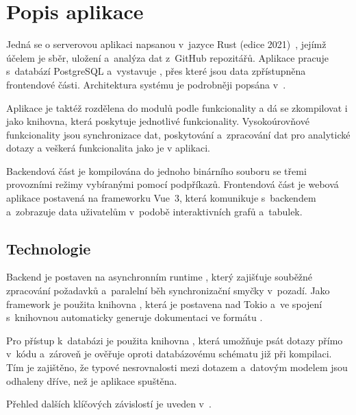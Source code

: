\section{Popis aplikace}
\label{sec:implementation:crabeye}

Jedná se o serverovou aplikaci napsanou v~jazyce Rust (edice 2021)~\cite{klabnik2018rust}, jejímž účelem je sběr, uložení a~analýza dat z~GitHub repozitářů. Aplikace pracuje s~databází PostgreSQL a~vystavuje \REST \API, přes které jsou data zpřístupněna frontendové části. Architektura systému je podrobněji popsána v~.

Aplikace je taktéž rozdělena do modulů podle funkcionality a dá se zkompilovat i jako knihovna, která poskytuje jednotlivé funkcionality. Vysokoúrovňové funkcionality jsou synchronizace dat, poskytování \API a~zpracování dat pro analytické dotazy a veškerá funkcionalita jako je v aplikaci.

Backendová část je kompilována do jednoho binárního souboru se třemi provozními režimy vybíranými pomocí \CLI podpříkazů. Frontendová část je webová \SPA aplikace postavená na frameworku Vue~3, která komunikuje s~\REST \API backendem a~zobrazuje data uživatelům v~podobě interaktivních grafů a~tabulek.

\subsection{Technologie}
\label{subsec:implementation:crabeye:techstack}

Backend je postaven na asynchronním runtime , který zajišťuje souběžné zpracování \HTTP požadavků a~paralelní běh synchronizační smyčky v~pozadí. Jako \HTTP framework je použita knihovna , která je postavena nad Tokio a~ve spojení s~knihovnou  automaticky generuje dokumentaci \API ve formátu .

Pro přístup k~databázi je použita knihovna , která umožňuje psát \SQL dotazy přímo v~kódu a~zároveň je ověřuje oproti databázovému schématu již při kompilaci. Tím je zajištěno, že typové nesrovnalosti mezi dotazem a~datovým modelem jsou odhaleny dříve, než je aplikace spuštěna.

Přehled dalších klíčových závislostí je uveden v~.

